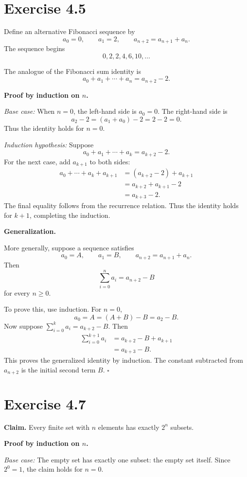 \documentclass[11pt]{article}
\newcommand{\qed}{\hfill$\square$}
\begin{document}
\section*{Exercise 4.5}

Define an alternative Fibonacci sequence by
\[
a_0=0,\qquad a_1=2,\qquad
a_{n+2}=a_{n+1}+a_n.
\]
The sequence begins
\[
0,2,2,4,6,10,\ldots
\]

The analogue of the Fibonacci sum identity is
\[
\boxed{a_0+a_1+\cdots+a_n=a_{n+2}-2.}
\]

\textbf{Proof by induction on $n$.}

\textit{Base case:} When $n=0$, the left-hand side is
$a_0=0$. The right-hand side is
\[
a_2-2=(a_1+a_0)-2=2-2=0.
\]
Thus the identity holds for $n=0$.

\textit{Induction hypothesis:} Suppose
\[
a_0+a_1+\cdots+a_k=a_{k+2}-2.
\]
For the next case, add $a_{k+1}$ to both sides:
\begin{align*}
a_0+\cdots+a_k+a_{k+1}
&=(a_{k+2}-2)+a_{k+1}\\
&=a_{k+2}+a_{k+1}-2\\
&=a_{k+3}-2.
\end{align*}
The final equality follows from the recurrence relation.
Thus the identity holds for $k+1$, completing the induction.

\textbf{Generalization.}

More generally, suppose a sequence satisfies
\[
a_0=A,\qquad a_1=B,\qquad
a_{n+2}=a_{n+1}+a_n.
\]
Then
\[
\boxed{\sum_{i=0}^{n}a_i=a_{n+2}-B}
\]
for every $n\geq 0$.

To prove this, use induction. For $n=0$,
\[
a_0=A=(A+B)-B=a_2-B.
\]
Now suppose $\sum_{i=0}^{k}a_i=a_{k+2}-B$.
Then
\begin{align*}
\sum_{i=0}^{k+1}a_i
&=a_{k+2}-B+a_{k+1}\\
&=a_{k+3}-B.
\end{align*}
This proves the generalized identity by induction.
The constant subtracted from $a_{n+2}$ is the initial
second term $B$. \qed

\section*{Exercise 4.7}

\textbf{Claim.} Every finite set with $n$ elements has
exactly $2^n$ subsets.

\textbf{Proof by induction on $n$.}

\textit{Base case:} The empty set has exactly one subset:
the empty set itself. Since $2^0=1$, the claim holds
for $n=0$.
\end{document}

